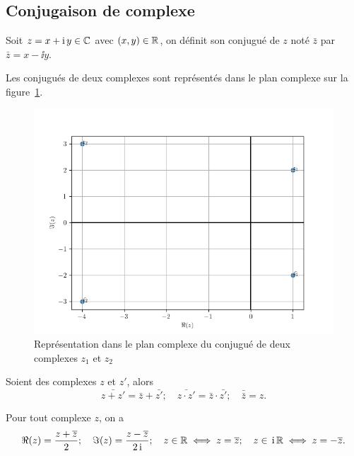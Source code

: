 \subsection{Conjugaison de complexe}\label{subsec:conjugaisoncomplexe}

\begin{defdef}
  Soit \(z = x + \operatorname{i}{}y \in{}\mathbb{C}\) avec \((x, y)\in{}\mathbb{R}\), on définit son conjugué 
  de \(z\) noté \(\bar{z}\) par \(\bar{z} = x- \ii{}y\).
\end{defdef}
Les conjugués de deux complexes sont représentés dans le plan complexe sur la 
figure~\ref{fig:conjugueComplexe}.

\begin{figure}
  \centering
  \includegraphics[scale = 0.8]{conjugue.png}
  \caption{Représentation dans le plan complexe du conjugué de deux complexes 
  \(z_1\) et \(z_2\)}\label{fig:conjugueComplexe}
\end{figure}

\begin{prop}
  Soient des complexes \(z\) et \(z'\), alors
  \begin{equation}
    \bar{z + z'} = \bar{z} + \bar{z'}; \quad \bar{z \cdot z'} = \bar{z} 
    \cdot \bar{z'}; \quad \bar{\bar{z}} = z.
  \end{equation}
\end{prop}

\begin{prop}
  Pour tout complexe \(z\), on a
  \begin{equation}
    \Re(z) = \frac{z + \overline{z}}{2}; \quad \Im(z) = \frac{z-\overline{z}}{2 \operatorname{i}}; 
    \quad z \in{}\mathbb{R} \iff z = \overline{z}; \quad z \in{}\operatorname{i}\mathbb{R} \iff z = -\overline{z}.
  \end{equation}
\end{prop}


